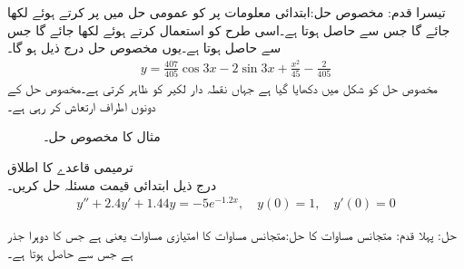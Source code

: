 تیسرا قدم: مخصوص حل:\quad ابتدائی معلومات   پر  کو عمومی حل میں پر کرتے ہوئے  لکھا جائے گا جس سے  حاصل ہوتا ہے۔اسی طرح  کو استعمال کرتے ہوئے  لکھا جائے گا جس سے  حاصل ہوتا ہے۔یوں مخصوص حل درج ذیل ہو گا۔
\begin{align*}
y=\frac{407}{405}\cos 3x-2\sin 3x+\frac{x^2}{45}-\frac{2}{405}
\end{align*}
مخصوص حل کو شکل  میں دکھایا گیا ہے جہاں نقطہ دار لکیر  کو ظاہر کرتی ہے۔مخصوص حل  کے دونوں  اطراف ارتعاش کر رہی ہے۔
\begin{figure}
\centering
{}
\caption{مثال  کا مخصوص حل۔}
\label{شکل_مثال_سادہ_دو_نا_معلوم_سر_الف}
\end{figure}
\quad ترمیمی قاعدے کا اطلاق\\
درج ذیل ابتدائی قیمت مسئلہ حل کریں۔
\begin{align*}
y''+2.4y'+1.44y=-5e^{-1.2x}, \quad y(0)=1, \quad y'(0)=0
\end{align*}

حل: پہلا قدم: متجانس مساوات کا حل:\quad متجانس مساوات کا امتیازی مساوات  یعنی  ہے جس کا دوہرا جذر  ہے جس سے  حاصل ہوتا ہے۔

